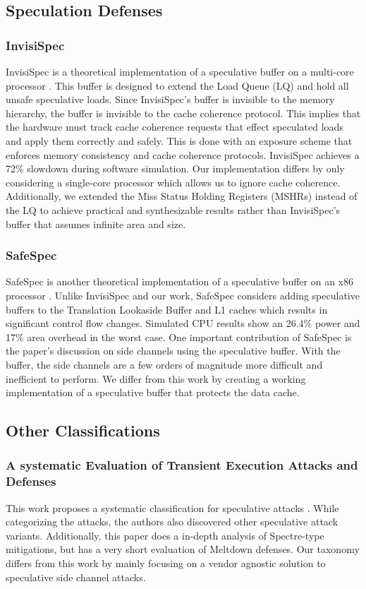 \subsection{Speculation Defenses}

\subsubsection{InvisiSpec}

InvisiSpec is a theoretical implementation of a speculative buffer on a multi-core
processor \cite{b46}. This buffer is designed to extend the Load Queue (LQ) and hold all unsafe speculative loads.
Since InvisiSpec's buffer is invisible to the memory hierarchy, the buffer is
invisible to the cache coherence protocol. This implies that the hardware must track cache
coherence requests that effect speculated loads and apply them correctly and safely. This is
done with an exposure scheme that enforces memory consistency and cache coherence protocols.
InvisiSpec achieves a 72\% slowdown during software simulation. Our implementation differs by only
considering a single-core processor which allows us to ignore cache coherence. Additionally, we extended the Miss
Status Holding Registers (MSHRs) instead of the LQ to achieve practical and synthesizable results
rather than InvisiSpec's buffer that assumes infinite area and size.

\subsubsection{SafeSpec}

SafeSpec is another theoretical implementation of a speculative buffer on an x86 processor \cite{b29}.
Unlike InvisiSpec and our work, SafeSpec considers adding speculative buffers to the Translation Lookaside Buffer and 
L1 caches which results in significant control flow changes.
Simulated CPU results show an 26.4\% power and 17\% area overhead in the worst case. One
important contribution of SafeSpec is the paper's discussion on side channels using the speculative
buffer. With the buffer, the side channels are a few orders of magnitude more difficult and inefficient to perform.
We differ from this work by creating a working implementation of a speculative buffer that protects the data cache.

\subsection{Other Classifications}

\subsubsection{A systematic Evaluation of Transient Execution Attacks and Defenses}

This work proposes a systematic classification for speculative attacks \cite{b48}. While categorizing
the attacks, the authors also discovered other speculative attack variants.
Additionally, this paper does a in-depth analysis of Spectre-type
mitigations, but has a very short evaluation of Meltdown defenses.
Our taxonomy differs from this work by mainly focusing on a vendor agnostic solution to speculative side channel
attacks.
